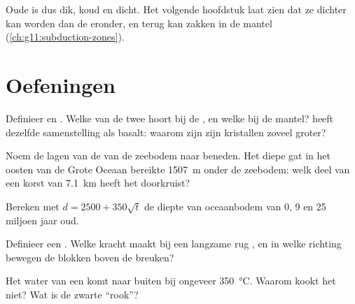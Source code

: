 Oude  is dus dik, koud en dicht. Het volgende hoofdstuk
laat zien dat ze dichter kan worden dan de  eronder, en terug kan
zakken in de mantel (\cref{ch:g11:subduction-zones}).

\section{Oefeningen}

\begin{exercise}[$\star$]\label{exo:g11:ocean-ridges:1}
Definieer  en . Welke van de twee hoort bij de ,
en welke bij de mantel?  heeft dezelfde samenstelling als basalt: waarom zijn
zijn kristallen zoveel groter?
\end{exercise}

\begin{exercise}[$\star$]\label{exo:g11:ocean-ridges:2}
Noem de lagen van de  van de zeebodem naar beneden. Het diepe
gat in het oosten van de Grote Oceaan bereikte \qty{1507}{m} onder de zeebodem: welk
deel van een korst van \qty{7.1}{km} heeft het doorkruist?
\end{exercise}

\begin{exercise}[$\star$]\label{exo:g11:ocean-ridges:3}
Bereken met $d = 2500 + 350\sqrt{t}$ de diepte van oceaanbodem van 0, 9 en 25
miljoen jaar oud.
\end{exercise}

\begin{exercise}[$\star$]\label{exo:g11:ocean-ridges:4}
Definieer een . Welke kracht maakt bij een langzame rug , en
in welke richting bewegen de blokken boven de breuken?
\end{exercise}

\begin{exercise}[$\star$]\label{exo:g11:ocean-ridges:5}
Het water van een  komt naar buiten bij ongeveer \qty{350}{\celsius}. Waarom
kookt het niet? Wat is de zwarte ``rook''?
\end{exercise}

